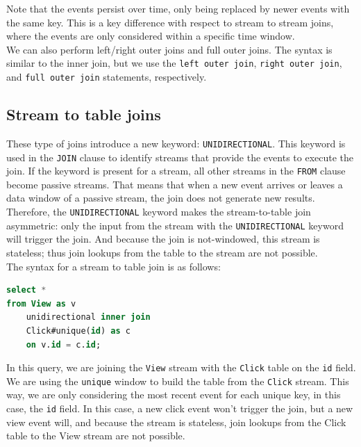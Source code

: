 Note that the events persist over time, only being replaced by newer events with the same
key. This is a key difference with respect to stream to stream joins, where the events are
only considered within a specific time window.\\

We can also perform left/right outer joins and full outer joins. The syntax is similar to
the inner join, but we use the \texttt{left outer join}, \texttt{right outer join}, and
\texttt{full outer join} statements, respectively.

\subsection{Stream to table joins}

These type of joins introduce a new keyword: \texttt{UNIDIRECTIONAL}. This keyword is used in
the \texttt{JOIN} clause to identify streams that provide the events to execute the join. If
the keyword is present for a stream, all other streams in the \texttt{FROM} clause become
passive streams. That means that when a new event arrives or leaves a data window of a passive
stream, the join does not generate new results.\\

Therefore, the \texttt{UNIDIRECTIONAL} keyword makes the stream-to-table join asymmetric: only
the input from the stream with the \texttt{UNIDIRECTIONAL} keyword will trigger the join. And 
because the join is not-windowed, this stream is stateless; thus join lookups from the table 
to the stream are not possible.\\

The syntax for a stream to table join is as follows:\\

\begin{lstlisting}[language=SQL]
select *
from View as v
    unidirectional inner join
    Click#unique(id) as c
    on v.id = c.id;
\end{lstlisting}

In this query, we are joining the \texttt{View} stream with the \texttt{Click} table on the
\texttt{id} field. We are using the \texttt{unique} window to build the table from the
\texttt{Click} stream. This way, we are only considering the most recent event for each
unique key, in this case, the \texttt{id} field. In this case, a new click event won't
trigger the join, but a new view event will, and because the stream is stateless, join
lookups from the Click table to the View stream are not possible.\\

